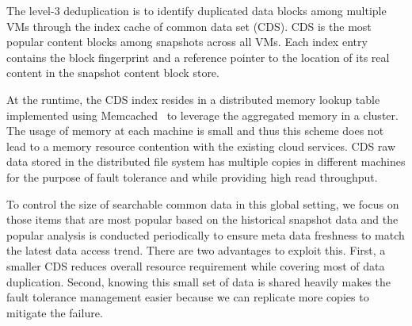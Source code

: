 The level-3 deduplication is to identify duplicated data blocks among multiple VMs through the index cache
of common data set (CDS).  CDS is the most popular content blocks 
among snapshots across all VMs. 
Each index entry contains  the block fingerprint and a reference pointer to the location of its real content
in the snapshot content block store.

At the runtime, the CDS index resides in a distributed  memory lookup table  
implemented using Memcached~\cite{memcached} to leverage the aggregated memory in a cluster.
The usage of memory at each machine is small and thus  this scheme  does not
lead to  a memory resource contention with the existing cloud services.
CDS raw data stored  in the distributed file system
has multiple copies in different machines for the purpose of fault tolerance and 
while providing high read throughput.  



To control the size of searchable common data in this global setting, we focus on those items that 
are most popular based on the historical snapshot data and the popular analysis is conducted periodically to ensure 
meta data freshness to match the latest data access trend.
There are two advantages to exploit this.
First, a smaller CDS reduces overall resource requirement while covering most of data duplication.
Second, knowing this small set of data is shared heavily makes the fault tolerance management 
easier because we can replicate more copies to mitigate the failure.

